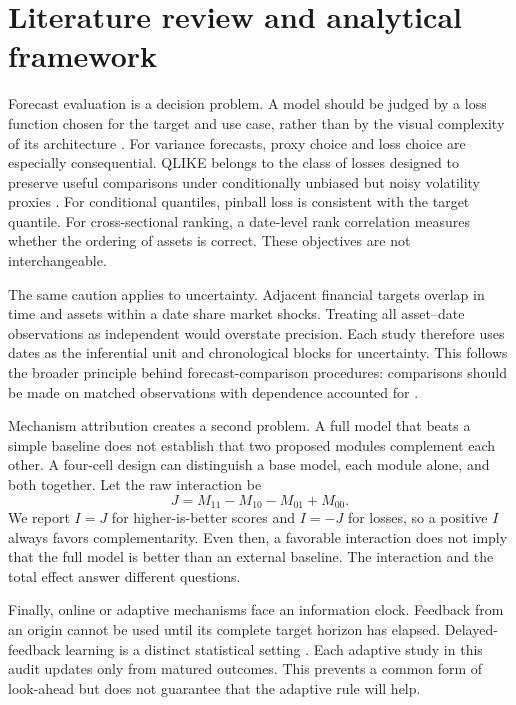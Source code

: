 \documentclass{crebss}
\begin{document}
\section{Literature review and analytical framework}

Forecast evaluation is a decision problem. A model should be judged by a loss function chosen for the target and use case, rather than by the visual complexity of its architecture \citep{gneiting2011point}. For variance forecasts, proxy choice and loss choice are especially consequential. QLIKE belongs to the class of losses designed to preserve useful comparisons under conditionally unbiased but noisy volatility proxies \citep{patton2011volatility}. For conditional quantiles, pinball loss is consistent with the target quantile. For cross-sectional ranking, a date-level rank correlation measures whether the ordering of assets is correct. These objectives are not interchangeable.

The same caution applies to uncertainty. Adjacent financial targets overlap in time and assets within a date share market shocks. Treating all asset--date observations as independent would overstate precision. Each study therefore uses dates as the inferential unit and chronological blocks for uncertainty. This follows the broader principle behind forecast-comparison procedures: comparisons should be made on matched observations with dependence accounted for \citep{diebold1995predictive,hansen2011mcs}.

Mechanism attribution creates a second problem. A full model that beats a simple baseline does not establish that two proposed modules complement each other. A four-cell design can distinguish a base model, each module alone, and both together. Let the raw interaction be
\[
  J = M_{11}-M_{10}-M_{01}+M_{00}.
\]
We report $I=J$ for higher-is-better scores and $I=-J$ for losses, so a positive $I$ always favors complementarity. Even then, a favorable interaction does not imply that the full model is better than an external baseline. The interaction and the total effect answer different questions.

Finally, online or adaptive mechanisms face an information clock. Feedback from an origin cannot be used until its complete target horizon has elapsed. Delayed-feedback learning is a distinct statistical setting \citep{joulani2013delayed}. Each adaptive study in this audit updates only from matured outcomes. This prevents a common form of look-ahead but does not guarantee that the adaptive rule will help.
\end{document}
